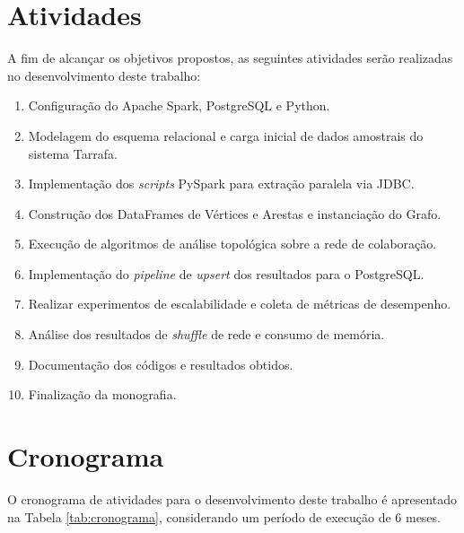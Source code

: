 \section{Atividades}
\label{sec:atividades}

A fim de alcançar os objetivos propostos, as seguintes atividades serão realizadas no desenvolvimento deste trabalho:

\begin{enumerate}
    \item Configuração do Apache Spark, PostgreSQL e Python.
    \item Modelagem do esquema relacional e carga inicial de dados amostrais do sistema Tarrafa.
    \item Implementação dos \textit{scripts} PySpark para extração paralela via JDBC.
    \item Construção dos DataFrames de Vértices e Arestas e instanciação do Grafo.
    \item Execução de algoritmos de análise topológica sobre a rede de colaboração.
    \item Implementação do \textit{pipeline} de \textit{upsert} dos resultados para o PostgreSQL.
    \item Realizar experimentos de escalabilidade e coleta de métricas de desempenho.
    \item Análise dos resultados de \textit{shuffle} de rede e consumo de memória.
    \item Documentação dos códigos e resultados obtidos.
    \item Finalização da monografia.
\end{enumerate}

\section{Cronograma}
\label{sec:cronograma}

O cronograma de atividades para o desenvolvimento deste trabalho é apresentado na Tabela \ref{tab:cronograma}, considerando um período de execução de 6 meses.

